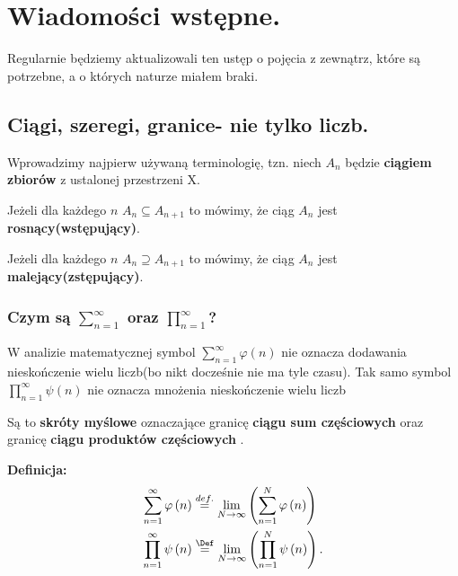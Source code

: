 \chapter{Wiadomości wstępne.}
Regularnie będziemy aktualizowali ten ustęp o pojęcia z zewnątrz, które są potrzebne, a o których naturze miałem braki.

\section{Ciągi, szeregi, granice- nie tylko liczb.}

Wprowadzimy najpierw używaną terminologię, tzn. niech $A_{n}$ będzie \textbf{ciągiem zbiorów} z ustalonej przestrzeni X.
\begin{definition}

		Jeżeli dla każdego $n$ $A_{n}\subseteq A_{n+1} $ to mówimy, że ciąg $A_{n}$ jest \textbf{rosnący(wstępujący)}. 
\end{definition} 
\begin{definition}
	
		Jeżeli dla każdego $n$ $A_{n} \supseteq A_{n+1}$ to mówimy, że ciąg $A_{n}$ jest \textbf{malejący(zstępujący)}. 	
\end{definition} 

\subsection{Czym są $\sum_{n=1}^{\infty}$ oraz $\prod_{n=1}^{\infty}$?}

W analizie matematycznej symbol $\sum_{n=1}^{\infty} \varphi\left( n \right) $ nie oznacza dodawania nieskończenie wielu liczb(bo nikt docześnie nie ma tyle czasu). Tak samo symbol $\prod_{n=1}^{\infty} \psi\left( n \right)$ nie oznacza mnożenia nieskończenie wielu liczb

Są to \textbf{skróty myślowe} oznaczające granicę \textbf{ciągu sum częściowych} oraz granicę \textbf{ciągu produktów częściowych} .

\textbf{Definicja:}
\begin{align*}
	\sum_{n=1}^{\infty} \varphi\left( n \right)  &\overset{def.}{=} \lim_{N \to \infty} \left( \sum_{n=1}^{N} \varphi\left( n \right)  \right) \\
	\prod_{n=1}^{\infty} \psi\left( n \right) &\overset{\Def}{=} \lim_{N \to \infty} \left( \prod_{n=1}^{N} \psi\left( n \right) \right)  
.\end{align*}

